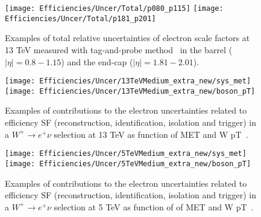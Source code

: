     \begin{figure}[htbp]
    	\centering
    	\texttt{[image: Efficiencies/Uncer/Total/p080\_p115]}
    	\texttt{[image: Efficiencies/Uncer/Total/p181\_p201]}
    	\caption{Examples of total relative uncertainties of electron scale factors at 13 TeV measured with tag-and-probe method~\cite{int_note_electrons} in the barrel ($|\eta| = 0.8-1.15$) and the end-cap ($|\eta| = 1.81-2.01$).}
    	\label{fig:all_uncertainty_tp}
    \end{figure}
    
    \begin{figure}[htbp]
    	\begin{center}
    		\texttt{[image: Efficiencies/Uncer/13TeVMedium\_extra\_new/sys\_met]}
    		\texttt{[image: Efficiencies/Uncer/13TeVMedium\_extra\_new/boson\_pT]}
    		\caption{Examples of contributions to the electron uncertainties related to
    			efficiency SF (reconstruction, identification, isolation and
    			trigger) in a $W^{+}\rightarrow e^{+}\nu$ selection at 13 TeV as
    			function of MET and W pT~\cite{int_note_electrons}.}
    		\label{fig:total_sys_13_medium}
    	\end{center}
    \end{figure}
    
    
    \begin{figure}[htbp]
    	\begin{center}
    		\texttt{[image: Efficiencies/Uncer/5TeVMedium\_extra\_new/sys\_met]}
    		\texttt{[image: Efficiencies/Uncer/5TeVMedium\_extra\_new/boson\_pT]}
    		\caption{Examples of contributions to the electron uncertainties related to
    			efficiency SF (reconstruction, identification, isolation and
    			trigger) in a $W^{+}\rightarrow e^{+}\nu$ selection at 5 TeV as
    			function of of MET and W pT~\cite{int_note_electrons}.}
    		\label{fig:total_sys_5_medium}
    	\end{center}
    \end{figure}
    \clearpage
    
